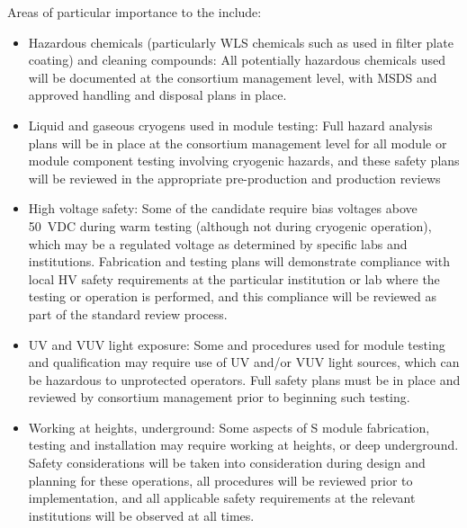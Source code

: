 Areas of particular importance to the  include:
\begin{itemize}
\item Hazardous chemicals (particularly WLS chemicals such as  used in filter plate coating) and cleaning compounds:  All potentially hazardous chemicals used will be documented at the consortium management level, with MSDS and approved handling and disposal plans in place.

\item Liquid and gaseous cryogens used in module testing:  Full hazard analysis plans will be in place at the consortium management level for all module or module component testing involving cryogenic hazards, and these safety plans will be reviewed in the appropriate pre-production and production reviews

\item High voltage safety:  Some of the candidate  require bias voltages above \SI{50}{VDC} during warm testing (although not during cryogenic operation), which may be a regulated voltage as determined by specific labs and institutions.  Fabrication and testing plans will demonstrate compliance with local HV safety requirements at the particular institution or lab where the testing or operation is performed, and this compliance will be reviewed as part of the standard review process.

\item UV and VUV light exposure:  Some  and  procedures used for module testing and qualification may require use of UV and/or VUV light sources, which can be hazardous  to unprotected operators.  Full safety plans must be in place and reviewed by consortium management prior to beginning such testing.

\item Working at heights, underground:  Some aspects of S module fabrication, testing and installation may require working at heights, or deep underground.  Safety considerations will be taken into consideration during design and planning for these operations, all procedures will be reviewed prior to implementation, and all applicable safety requirements at the relevant institutions will be observed at all times.

\end{itemize}
